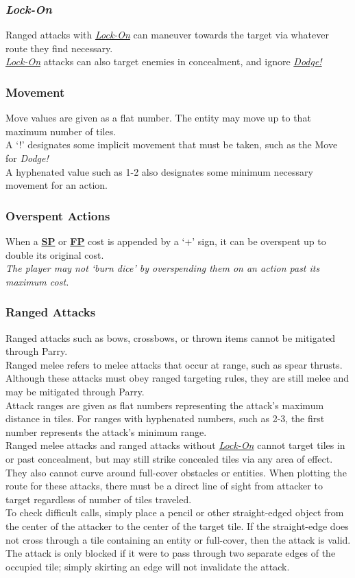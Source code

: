 \documentclass[12pt]{article}
\newcommand{\refto}[1]{\hyperlink{#1}{\textbf{#1}}}
\newcommand{\reftoit}[1]{\hyperlink{#1}{\emph{#1}}}
\begin{document}
\begin{multicols*}{2}
\subsubsection{\emph{Lock-On}}
\hypertarget{Lock-On}{}
Ranged attacks with \reftoit{Lock-On} can maneuver towards the target via whatever route they find necessary.\\
\reftoit{Lock-On} attacks can also target enemies in concealment, and ignore \reftoit{Dodge!}

\subsubsection{Movement}
Move values are given as a flat number. The entity may move up to that maximum number of tiles.\\
A ‘!’ designates some implicit movement that must be taken, such as the Move for \emph{Dodge!}\\
A hyphenated value such as 1-2 also designates some minimum necessary movement for an action.

\subsubsection{Overspent Actions}
When a \refto{SP} or \refto{FP} cost is appended by a ‘+’ sign, it can be overspent up to double its original cost.\\
\emph{The player may not ‘burn dice’ by overspending them on an action past its maximum cost.}

\subsubsection{Ranged Attacks}
Ranged attacks such as bows, crossbows, or thrown items cannot be mitigated through Parry.\\
Ranged melee refers to melee attacks that occur at range, such as spear thrusts. Although these attacks must obey ranged targeting rules, they are still melee and may be mitigated through Parry.\\
Attack ranges are given as flat numbers representing the attack’s maximum distance in tiles. For ranges with hyphenated numbers, such as 2-3, the first number represents the attack’s minimum range.\\
Ranged melee attacks and ranged attacks without \reftoit{Lock-On} cannot target tiles in or past concealment, but may still strike concealed tiles via any area of effect. They also cannot curve around full-cover obstacles or entities. When plotting the route for these attacks, there must be a direct line of sight from attacker to target regardless of number of tiles traveled.\\
To check difficult calls, simply place a pencil or other straight-edged object from the center of the attacker to the center of the target tile. If the straight-edge does not cross through a tile containing an entity or full-cover, then the attack is valid.\\
The attack is only blocked if it were to pass through two separate edges of the occupied tile; simply skirting an edge will not invalidate the attack.\\


\end{multicols*}
\end{document}
